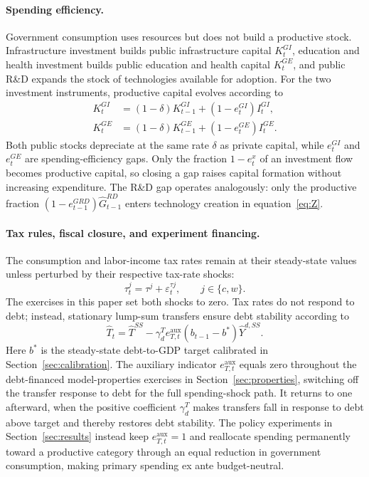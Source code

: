 \documentclass[a4paper,11pt]{article}
\begin{document}
\paragraph{Spending efficiency.}
Government consumption uses resources but does not build a productive stock.
Infrastructure investment builds public infrastructure capital $K_t^{GI}$, education and health investment builds public education and health capital $K_t^{GE}$, and public R\&D expands the stock of technologies available for adoption.
For the two investment instruments, productive capital evolves according to
\begin{align}
    K_t^{GI} &= \left(1 - \delta\right) K_{t-1}^{GI} + \left(1 - e_t^{GI}\right) I_t^{GI}, \label{eq:kgi} \\
    K_t^{GE} &= \left(1 - \delta\right) K_{t-1}^{GE} + \left(1 - e_t^{GE}\right) I_t^{GE}. \label{eq:kge}
\end{align}
Both public stocks depreciate at the same rate $\delta$ as private capital, while $e_t^{GI}$ and $e_t^{GE}$ are spending-efficiency gaps.
Only the fraction $1-e_t^x$ of an investment flow becomes productive capital, so closing a gap raises capital formation without increasing expenditure.
The R\&D gap operates analogously: only the productive fraction $\left(1-e_{t-1}^{GRD}\right)\hat{G}_{t-1}^{RD}$ enters technology creation in equation~\eqref{eq:Z}.

\paragraph{Tax rules, fiscal closure, and experiment financing.}
The consumption and labor-income tax rates remain at their steady-state values unless perturbed by their respective tax-rate shocks:
\begin{equation} \label{eq:taxrules}
    \tau_t^j = \tau^j + \varepsilon_t^{\tau j}, \qquad j\in\{c,w\}.
\end{equation}
The exercises in this paper set both shocks to zero.
Tax rates do not respond to debt; instead, stationary lump-sum transfers ensure debt stability according to
\begin{equation} \label{eq:transferrule}
    \hat{T}_t = \hat{T}^{SS}
    - \gamma_d^T e_{T,t}^{\mathrm{aux}}
    \left(b_{t-1}-b^*\right)\hat{Y}^{d,SS}.
\end{equation}
Here $b^*$ is the steady-state debt-to-GDP target calibrated in Section~\ref{sec:calibration}. The auxiliary indicator $e_{T,t}^{\mathrm{aux}}$ equals zero throughout the debt-financed model-properties exercises in Section~\ref{sec:properties}, switching off the transfer response to debt for the full spending-shock path.
It returns to one afterward, when the positive coefficient $\gamma_d^T$ makes transfers fall in response to debt above target and thereby restores debt stability.
The policy experiments in Section~\ref{sec:results} instead keep $e_{T,t}^{\mathrm{aux}}=1$ and reallocate spending permanently toward a productive category through an equal reduction in government consumption, making primary spending ex ante budget-neutral.
\end{document}
